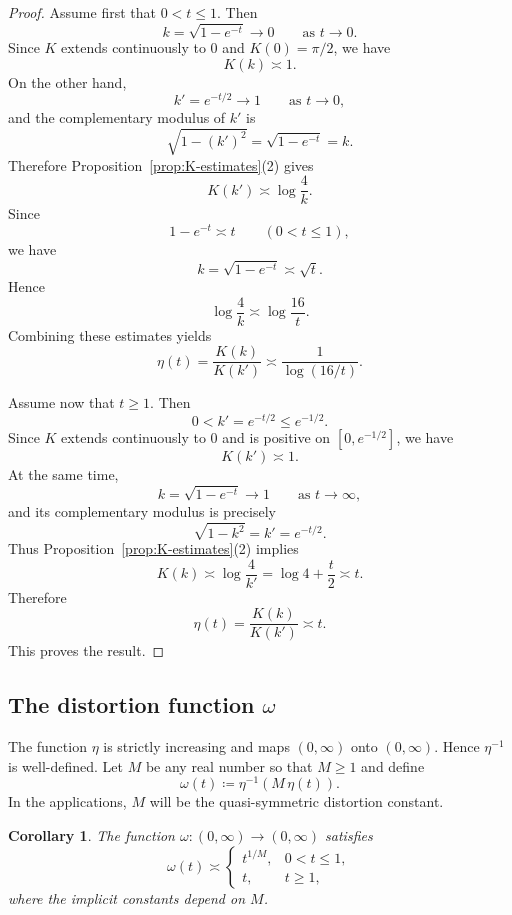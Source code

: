 \documentclass[12pt]{amsart}
\numberwithin{equation}{section}
\numberwithin{figure}{section}
\newtheorem{corollary}[equation]{Corollary}
\theoremstyle{definition}
\theoremstyle{plain}
\begin{document}
\begin{proof}
Assume first that $0<t\le 1$. Then
\[
k=\sqrt{1-e^{-t}}\to 0
\qquad\text{as }t\to0.
\]
Since $K$ extends continuously to $0$ and $K(0)=\pi/2$, we have
\[
K(k)\asymp 1.
\]
On the other hand,
\[
k'=e^{-t/2}\to 1
\qquad\text{as }t\to 0,
\]
and the complementary modulus of $k'$ is
\[
\sqrt{1-(k')^2}=\sqrt{1-e^{-t}}=k.
\]
Therefore Proposition~\ref{prop:K-estimates}(2) gives
\[
K(k')\asymp \log\frac{4}{k}.
\]
Since
\[
1-e^{-t}\asymp t
\qquad (0<t\le 1),
\]
we have
\[
k=\sqrt{1-e^{-t}}\asymp \sqrt t.
\]
Hence
\[
\log\frac{4}{k}\asymp \log\frac{16}{t}.
\]
Combining these estimates yields
\[
\eta(t)=\frac{K(k)}{K(k')}
\asymp \frac{1}{\log(16/t)}.
\]

Assume now that $t\ge 1$. Then
\[
0<k'=e^{-t/2}\le e^{-1/2}.
\]
Since $K$ extends continuously to $0$ and is positive on
$[0,e^{-1/2}]$, we have
\[
K(k')\asymp 1.
\]
At the same time,
\[
k=\sqrt{1-e^{-t}}\to 1
\qquad\text{as }t\to\infty,
\]
and its complementary modulus is precisely
\[
\sqrt{1-k^2}=k'=e^{-t/2}.
\]
Thus Proposition~\ref{prop:K-estimates}(2) implies
\[
K(k)\asymp \log\frac{4}{k'}
=\log 4+\frac t2
\asymp t.
\]
Therefore
\[
\eta(t)=\frac{K(k)}{K(k')}
\asymp t.
\]
This proves the result.
\end{proof}

\subsection{The distortion function $\omega$}

The function $\eta$ is strictly increasing and maps $(0,\infty)$
onto $(0,\infty)$. Hence $\eta^{-1}$ is well-defined.
Let $M$ be any real number so that $M\ge 1$ and define
\[
\omega(t)\coloneqq\eta^{-1}(M\,\eta(t)).
\]
In the applications, $M$ will be the quasi-symmetric distortion constant.

\begin{corollary}
\label{cor:omega-regimes}
The function $\omega:(0,\infty)\to(0,\infty)$ satisfies
\[
\omega(t)\asymp
\begin{cases}
t^{1/M}, & 0<t\le 1,\\[1.2ex]
t, & t\ge 1,
\end{cases}
\]
where the implicit constants depend on $M$.
\end{corollary}
\end{document}
